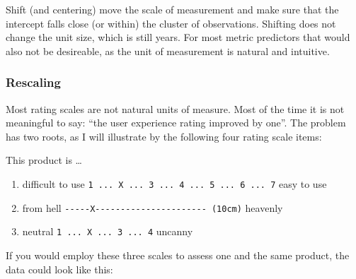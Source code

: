 \documentclass[]{svmono}
\providecommand{\tightlist}{%
  \setlength{\itemsep}{0pt}\setlength{\parskip}{0pt}}
\begin{document}
Shift (and centering) move the scale of measurement and make sure that
the intercept falls close (or within) the cluster of observations.
Shifting does not change the unit size, which is still years. For most
metric predictors that would also not be desireable, as the unit of
measurement is natural and intuitive.

\subsubsection{Rescaling}\label{rescaling}

Most rating scales are not natural units of measure. Most of the time it
is not meaningful to say: ``the user experience rating improved by
one''. The problem has two roots, as I will illustrate by the following
four rating scale items:

This product is \ldots{}

\begin{enumerate}
\def\labelenumi{\arabic{enumi}.}
\tightlist
\item
  difficult to use
  \texttt{\textbar{}1\ ...\ X\ ...\ 3\ ...\ 4\ ...\ 5\ ...\ 6\ ...\ 7\textbar{}}
  easy to use
\item
  from hell
  \texttt{\textbar{}-\/-\/-\/-\/-X-\/-\/-\/-\/-\/-\/-\/-\/-\/-\/-\/-\/-\/-\/-\/-\/-\/-\/-\/-\/-\/-\textbar{}\ (10cm)}
  heavenly
\item
  neutral \texttt{\textbar{}1\ ...\ X\ ...\ 3\ ...\ 4\textbar{}} uncanny
\end{enumerate}

If you would employ these three scales to assess one and the same
product, the data could look like this:
\end{document}
